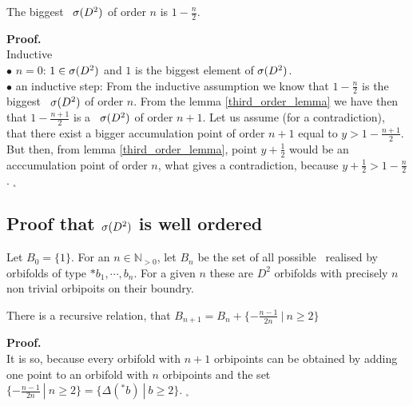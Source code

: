 \begin{theorem}\label{biggest \apots}
The biggest \apots\ ${{\sigma}(D^2)}$ of order $n$ is $1-\frac{n}{2}$.
\end{theorem}
\noindent\textbf{Proof.}\\
Inductive \\
$\bullet$ $n=0$: $1\in {{\sigma}(D^2)}$ and $1$ is the biggest element of ${{\sigma}(D^2)}$. \\
$\bullet$ an inductive step: From the inductive assumption we know that $1-\frac{n}{2}$ is 
the biggest \apots\ ${{\sigma}(D^2)}$ of order $n$. From the lemma \ref{third_order_lemma} we have then 
that $1-\frac{n+1}{2}$ is a \apots\ ${{\sigma}(D^2)}$ of order $n+1$. Let us assume (for a contradiction), 
that there exist a bigger accumulation point of order $n+1$ equal to $y > 1-\frac{n+1}{2}$. 
But then, from lemma \ref{third_order_lemma}, point $y+\frac{1}{2}$ would be an acccumulation 
point 
of order $n$, what gives a contradiction, because $y+\frac{1}{2}>1-\frac{n}{2}$. $_\square$ 

\subsection{Proof that ${{\sigma}(D^2)}$ is well ordered}

\begin{definition} 
Let $B_0 = \{1\}$.
For an $n \in \mathbb{N}_{>0}$, let $B_n$ be the set of all possible \Eoc\ realised 
by orbifolds of type 
$*b_1, \cdots, b_n$. For a given $n$ these are 
$D^2$ orbifolds with precisely $n$ non trivial orbipoits on their boundry.
\end{definition}


\begin{observation}\label{recursive_relation}
There is a recursive relation, that $B_{n+1}=B_n+\{-\frac{n-1}{2n}\ |\ n\geq 2\}$
\end{observation}
\textbf{Proof.} \\
It is so, because every orbifold with $n+1$ orbipoints can be obtained by adding one point 
to an orbifold with $n$ orbipoints and the set 
$\{-\frac{n-1}{2n}\ |\ n\geq 2\} = \{\Delta(^\ast b)\ |\ b \geq 2\}$. $_\square$


